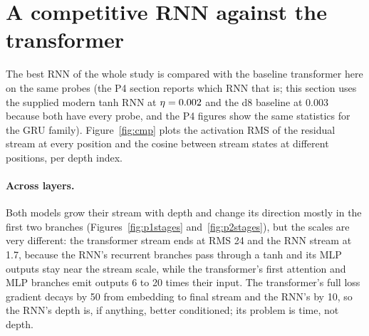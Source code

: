 \section{A competitive RNN against the transformer}
The best RNN of the whole study is compared with the baseline transformer here on the same probes (the P4 section reports which RNN that is; this section uses the supplied modern tanh RNN at $\eta=0.002$ and the d8 baseline at $0.003$ because both have every probe, and the P4 figures show the same statistics for the GRU family). Figure~\ref{fig:cmp} plots the activation RMS of the residual stream at every position and the cosine between stream states at different positions, per depth index.

\paragraph{Across layers.} Both models grow their stream with depth and change its direction mostly in the first two branches (Figures~\ref{fig:p1stages} and~\ref{fig:p2stages}), but the scales are very different: the transformer stream ends at RMS 24 and the RNN stream at 1.7, because the RNN's recurrent branches pass through a tanh and its MLP outputs stay near the stream scale, while the transformer's first attention and MLP branches emit outputs 6 to 20 times their input. The transformer's full loss gradient decays by 50 from embedding to final stream and the RNN's by 10, so the RNN's depth is, if anything, better conditioned; its problem is time, not depth.

